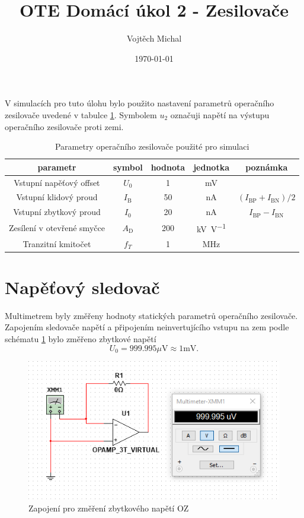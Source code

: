 \documentclass[twoside]{article}
\title{OTE Domácí úkol 2 - Zesilovače}
\author{Vojtěch Michal}
\date{\today}
\begin{document}
\maketitle

V simulacích pro tuto úlohu bylo použito nastavení parametrů operačního zesilovače uvedené v tabulce \ref{tab:oz_param}.
Symbolem $u_2$ označuji napětí na výstupu operačního zesilovače proti zemi.

\begin{table}[h!]
    \centering
    \begin{tabular}{c|c|c|c|c}
        parametr & symbol & hodnota & jednotka & poznámka\\
        \hline
        Vstupní napěťový offset & $U_0$ & 1 & \si{\milli\volt} & \\
        Vstupní klidový proud & $I_\text{B}$ & 50 & \si{\nano\ampere} & $(I_\text{BP} + I_\text{BN})/2$ \\
        Vstupní zbytkový proud & $I_0$ & 20 & \si{\nano\ampere} & $I_\text{BP} - I_\text{BN}$ \\
        Zesílení v otevřené smyčce & $A_\text{D}$ & 200 & \si{\kilo\volt\per\volt} & \\
        Tranzitní kmitočet& $f_T$ & 1 & \si{\mega\hertz} &
    \end{tabular}
    \caption{Parametry operačního zesilovače použité pro simulaci}
    \label{tab:oz_param}
\end{table}

\section{Napěťový sledovač}

Multimetrem byly změřeny hodnoty statických parametrů operačního zesilovače.
Zapojením sledovače napětí a připojením neinvertujícího vstupu na zem podle schématu \ref{fig:sledovac_voltage_offset}
bylo změřeno zbytkové napětí
\begin{equation}
    U_0 = 999.995 \mu \text{V} \approx 1 \si{\milli\volt}.
\end{equation}

\begin{figure}[h!]
    \centering
    \includegraphics[width=\linewidth]{sledovac_voltage_offset.png}
    \caption{Zapojení pro změření zbytkového napětí OZ}
    \label{fig:sledovac_voltage_offset}
\end{figure}
\end{document}

